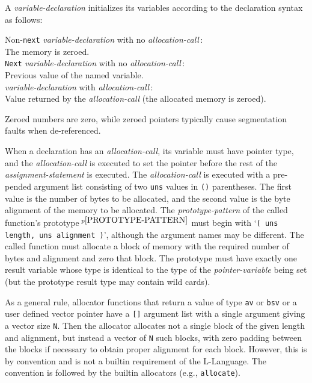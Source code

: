 \documentclass[12pt]{article}
\newcommand{\pagnote}[1]{$\,^{p\pageref{#1}}$}
\newenvironment{indpar}[1][0.3in]%
	{\begin{list}{}%
		     {\setlength{\itemsep}{0in}%
		      \setlength{\topsep}{0in}%
		      \setlength{\parsep}{1ex}%
		      \setlength{\labelwidth}{#1}%
		      \setlength{\leftmargin}{#1}%
		      \addtolength{\leftmargin}{\labelsep}}%
	 \item}%
	{\end{list}}
\begin{document}
A {\em variable-declaration}\label{VARIABLE-INITIALIZATION}
initializes its variables
according to the declaration syntax as follows:
\begin{indpar}[0.05in]
Non-{\tt next} {\em variable-declaration} with no {\em allocation-call}\,: \\
\hspace*{3em}The memory is zeroed. \\
{\tt Next} {\em variable-declaration} with no {\em allocation-call}\,: \\
\hspace*{3em}Previous value of the named variable. \\
{\em variable-declaration} with {\em allocation-call}\,: \\
\hspace*{3em}Value returned by the {\em allocation-call}
             (the allocated memory is zeroed).
\end{indpar}
Zeroed numbers are zero, while zeroed pointers typically
cause segmentation faults when de-referenced.

When a declaration has an {\em allocation-call}\label{ALLOCATION-CALLS},
its variable must have pointer
type, and the {\em allocation-call} is executed to set the pointer
before the rest of the {\em assignment-statement} is
executed.  The {\em allocation-call} is executed
with a pre-pended argument list consisting of two {\tt uns} values
in {\tt ()} parentheses.  The first value is the number of bytes to
be allocated, and the second value is the byte alignment of the
memory to be allocated.
The {\em prototype-pattern}
of the called function's prototype\pagnote{PROTOTYPE-PATTERN}
must begin with `{\tt ( uns length, uns alignment )}', although
the argument names may be different.
The called function must allocate a block of
memory with the required number of bytes and alignment and zero that
block.  The prototype must have
exactly one result variable whose type is identical to
the type of the {\em pointer-variable} being set (but the
prototype result type may contain wild cards).

As a general rule, allocator functions that return a value of
type {\tt av} or {\tt bsv} or a user defined vector pointer
have a {\tt []} argument list
with a single argument giving a vector size {\tt N}.
Then the allocator allocates not a single block of the given length
and alignment, but instead a vector of {\tt N} such blocks, with zero padding
between the blocks if necessary to obtain proper alignment for each
block.  However,
this is by convention and is not a builtin requirement of the L-Language.
The convention is followed by the builtin allocators (e.g., {\tt allocate}).
\end{document}
